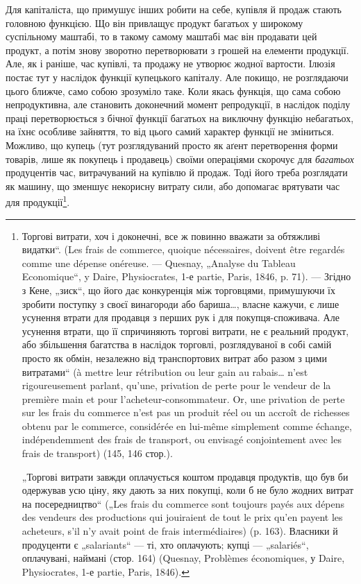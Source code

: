 Для капіталіста, що примушує інших робити на себе, купівля й
продаж стають головною функцією. Що він привлащує продукт багатьох
у широкому суспільному маштабі, то в такому самому маштабі має він
продавати цей продукт, а потім знову зворотно перетворювати з грошей
на елементи продукції. Але, як і раніше, час купівлі, та продажу не
утворює жодної вартости. Ілюзія постає тут у наслідок функції купецького
капіталу. Але покищо, не розглядаючи цього ближче, само собою
зрозуміло таке. Коли якась функція, що сама собою непродуктивна, але
становить доконечний момент репродукції, в наслідок поділу праці перетворюється
з бічної функції багатьох на виключну функцію небагатьох,
на їхнє особливе зайняття, то від цього самий характер функції не зміниться.
Можливо, що купець (тут розглядуваний просто як аґент перетворення
форми товарів, лише як покупець і продавець) своїми операціями
скорочує для \emph{багатьох} продуцентів час, витрачуваний на купівлю
й продаж. Тоді його треба розглядати як машину, що зменшує некорисну
витрату сили, або допомагає врятувати час для продукції\footnote{
Торгові витрати, хоч і доконечні, все ж повинно вважати за обтяжливі видатки“.
(Les frais de commerce, quoique nécessaires, doivent être regardés comme une
dépense onéreuse. — Quesnay, „Analyse du Tableau Economique“, y Daire, Physiocrates,
1-е partie, Paris, 1846, p. 71). — Згідно з Кене, „зиск“, що його дає конкуренція
між торговцями, примушуючи їх зробити поступку з своєї винагороди або бариша\dots{},
власне кажучи, є лише усунення втрати для продавця з перших
рук і для покупця-споживача. Але усунення втрати, що її спричиняють торгові
витрати, не є реальний продукт, або збільшення багатства в наслідок торговлі,
розглядуваної в собі самій просто як обмін, незалежно від транспортових витрат
або разом з цими витратами“ (à mettre leur rétribution ou leur gain au rabais\dots{}
n’est rigoureusement parlant, qu’une, privation de perte pour le vendeur de la première
main et pour l’acheteur-consommateur. Or, une privation de perte sur les frais du
commerce n'est pas un produit réel ou un accroît de richesses obtenu par le commerce,
considérée en lui-même simplement comme échange, indépendemment des frais de transport, ou envisagé
conjointement avec les frais de transport) (145, 146 стор.).

„Торгові витрати завжди оплачується коштом продавця продуктів, що був би
одержував усю ціну, яку дають за них покупці, коли б не було жодних витрат
на посередництво“ („Les frais du commerce sont toujours payés aux dépens des
vendeurs des productions qui jouiraient de tout le prix qu’en payent les acheteurs,
s’il n’y avait point de frais intermédiaires) (p. 163). Власники й продуценти є
„salariants“ — ті, хто оплачують; купці — „salariés“, оплачувані, наймані (стор. 164)
(Quesnay, Problèmes économiques, у Daire, Physiocrates, 1-е partie, Paris, 1846).
}.

